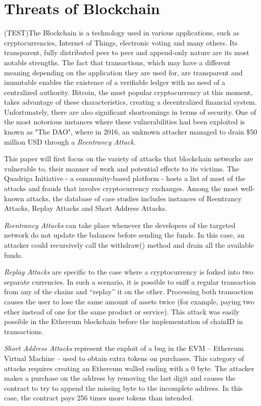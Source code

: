 \chapter{Threats of Blockchain}
(TEST)The Blockchain\cite{blockchainAttacks} is a technology used in various applications, such as cryptocurrencies, Internet of Things, electronic voting and many others. Its transparent, fully distributed peer to peer and append-only nature are its most notable strengths. The fact that transactions, which may have a different meaning depending on the application they are used for, are transparent and immutable enables the existence of a verifiable ledger with no need of a centralized authority. Bitcoin, the most popular cryptocurrency at this moment, takes advantage of these characteristics, creating a decentralized financial system. Unfortunately, there are also significant shortcomings in terms of security. One of the most notorious instances where these vulnerabilities had been exploited is known as "The DAO", where in 2016, an unknown attacker managed to drain \$50 million USD through a \textit{Reentrancy Attack}.

This paper will first focus on the variety of attacks that blockchain networks are vulnerable to, their manner of work and potential effects to its victims. The Quadriga Initiative\cite{quadriga}  - a community-based platform - hosts a list of most of the attacks and frauds that involve cryptocurrency exchanges. Among the most well-known attacks, the database of case studies includes instances of Reentrancy Attacks, Replay Attacks and Short Address Attacks.

\textit{Reentrancy Attacks}\cite{reentrancy} can take place whenever the developers of the targeted network do not update the balances before sending the funds. In this case, an attacker could recursively call the withdraw() method and drain all the available funds. 

\textit{Replay Attacks}\cite{replay} are specific to the case where a cryptocurrency is forked into two separate currencies. In such a scenario, it is possible to sniff a regular transaction from any of the chains and “replay” it on the other. Processing both transaction causes the user to lose the same amount of assets twice (for example, paying two ether instead of one for the same product or service). This attack was easily possible in the Ethereum blockchain before the implementation of chainID in transactions.

\textit{Short Address Attacks}\cite{blockchainAttacks} represent the exploit of a bug in the EVM – Ethereum Virtual Machine – used to obtain extra tokens on purchases. This category of attacks requires creating an Ethereum walled ending with a 0 byte. The attacker makes a purchase on the address by removing the last digit and causes the contract to try to append the missing byte to the incomplete address. In this case, the contract pays 256 times more tokens than intended. 

